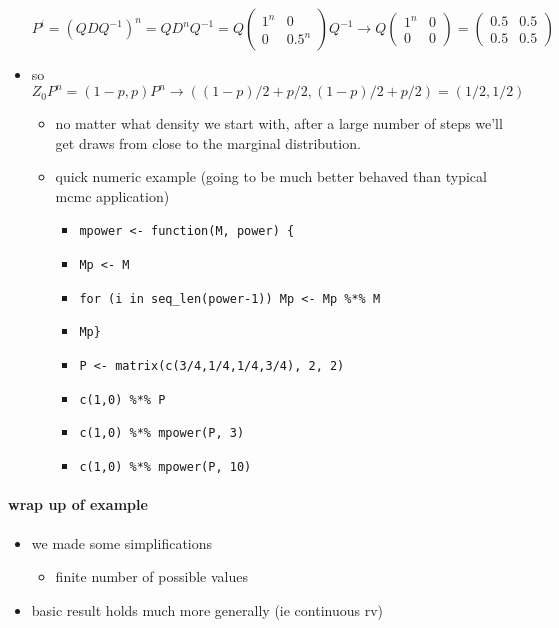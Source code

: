 \begin{itemize}
        \[P^{i} = (Q D Q^{-1})^n = Q D^n Q^{-1} = Q \begin{pmatrix}
        1^n & 0 \\ 0 & 0.5^n \end{pmatrix} Q^{-1} \to Q \begin{pmatrix}
        1^n & 0 \\ 0 & 0 \end{pmatrix} = \begin{pmatrix} 0.5 & 0.5
        \\ 0.5 & 0.5 \end{pmatrix}\]
\item so $Z_0 P^n = (1-p, p) P^n \to ((1-p)/2 + p/2, (1-p)/2 +
        p/2) = (1/2, 1/2)$
\begin{itemize}
\item no matter what density we start with, after a large number
          of steps we'll get draws from close to the marginal
          distribution.
\item quick numeric example (going to be much better behaved than
          typical mcmc application)
\begin{itemize}
\item \texttt{mpower <- function(M, power) \{}
\item \texttt{Mp <- M}
\item \texttt{for (i in seq\_len(power-1)) Mp <- Mp \%*\% M}
\item \texttt{Mp\}}
\item \texttt{P <- matrix(c(3/4,1/4,1/4,3/4), 2, 2)}
\item \texttt{c(1,0) \%*\% P}
\item \texttt{c(1,0) \%*\% mpower(P, 3)}
\item \texttt{c(1,0) \%*\% mpower(P, 10)}
\end{itemize}
\end{itemize}
\end{itemize}

\paragraph{wrap up of example}
\begin{itemize}
\item we made some simplifications
\begin{itemize}
\item finite number of possible values
\end{itemize}
\item basic result holds much more generally (ie continuous rv)
\end{itemize}

